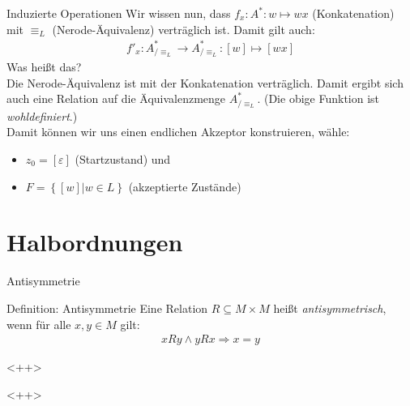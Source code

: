 \begin{frame}{Induzierte Operationen}
    Wir wissen nun, dass $f_x : A^*:w\mapsto wx$ (Konkatenation) mit $\equiv_L$ (Nerode-Äquivalenz) verträglich ist. Damit gilt auch:
    \pause
    \begin{align*}
        f'_x : A_{/\equiv_L}^* \rightarrow A_{/\equiv_L}^*:[w]\mapsto[wx]
    \end{align*}
    Was heißt das?\\
    \pause
    Die Nerode-Äquivalenz ist mit der Konkatenation verträglich. Damit ergibt sich auch eine Relation auf die Äquivalenzmenge $A_{/\equiv_L}^*$. (Die obige Funktion ist \emph{wohldefiniert}.)\\
    \pause
    Damit können wir uns einen endlichen Akzeptor konstruieren, wähle:
    \begin{itemize}
        \item $z_0 = [\varepsilon]$ (Startzustand) und
        \item $F = \left\{ [w] | w\in L \right\}$ (akzeptierte Zustände)
    \end{itemize}
\end{frame}
\section{Halbordnungen}
\begin{frame}{Antisymmetrie}
    \begin{block}{Definition: Antisymmetrie}
        Eine Relation $R\subseteq M\times M$ heißt \emph{antisymmetrisch}, wenn für alle $x, y \in M$ gilt:
        \begin{align*}
            xRy \wedge yRx \Rightarrow x=y
        \end{align*}
    \end{block}<++>
\end{frame}<++>

